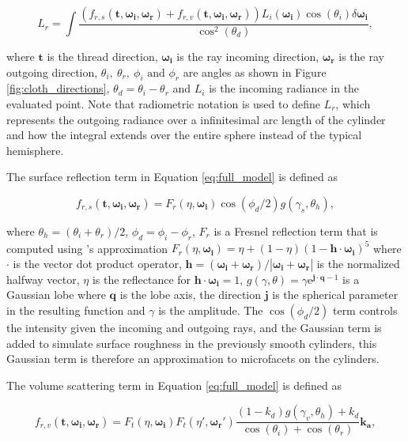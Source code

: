 \documentclass[12pt]{article}
\newcommand{\omegai}{\boldsymbol{\omega_i}}
\newcommand{\omegar}{\boldsymbol{\omega_r}}
\newcommand{\tb}{\mathbf{t}}
\begin{document}
\begin{equation}
L_r = \int \frac{\left(f_{r,s}(\tb, \omegai, \omegar) + f_{r,v}(\tb,\omegai,\omegar)\right)L_i(\omegai)\cos(\theta_i)\delta \omegai}{\cos^2(\theta_d)},
\label{eq:full_model}
\end{equation}

where $\tb$ is the thread direction, $\omegai$ is the ray incoming direction, $\omegar$ is the ray outgoing direction, $\theta_i, ~\theta_r, ~ \phi_i \mbox{ and } \phi_r$ are angles as shown in Figure \ref{fig:cloth_directions},  $\theta_d = \theta_i-\theta_r$ and $L_i$ is the incoming radiance in the evaluated point.
Note that radiometric notation \cite{Marschner2003} is used to define $L_r$, which represents the outgoing radiance over a infinitesimal arc length of the cylinder and how the integral extends over the entire sphere instead of the typical hemisphere.

The surface reflection term in Equation \ref{eq:full_model} is defined as

\begin{equation}
f_{r,s}(\tb, \omegai, \omegar) = F_r(\eta, \omegai) \cos(\phi_d/2)g(\gamma_s, \theta_h),
\end{equation}

where $\theta_h = (\theta_i+\theta_r)/2$, $\phi_d = \phi_i-\phi_r$, $F_r$ is a Fresnel reflection term that is computed using \citeauthor{Schlick1994}'s approximation \cite{Schlick1994} $F_r(\eta, \omegai) = \eta + (1 - \eta)(1 - \mathbf{h} \cdot \omegai)^5$ where $\cdot$ is the vector dot product operator, $\mathbf{h} = (\omegai + \omegar)/ \left|\omegai + \omegar \right|$ is the normalized halfway vector, $\eta$ is the reflectance for $\mathbf{h} \cdot \omegai = 1$, $g(\gamma, \theta) = \gamma \mathrm{e} ^{\mathbf{j} \cdot \mathbf{q}-1}$ is a Gaussian lobe \cite{Wang2009} where $\mathbf{q}$ is the lobe axis, the direction $\mathbf{j}$ is the spherical parameter in the resulting function and $\gamma$ is the amplitude.
The $\cos(\phi_d/2)$ term controls the intensity given the incoming and outgoing rays, and the Gaussian term is added to simulate surface roughness in the previously smooth cylinders, this Gaussian term is therefore an approximation to microfacets on the cylinders.

The volume scattering term in Equation \ref{eq:full_model} is defined as

\begin{equation}
f_{r,v}(\tb,\omegai,\omegar) = F_t(\eta, \omegai) F_t(\eta', \omegar') \frac{(1-k_d)g(\gamma_v, \theta_h)+k_d}{\cos(\theta_i) + \cos(\theta_r)} \mathbf{k_a},
\end{equation}
\end{document}
